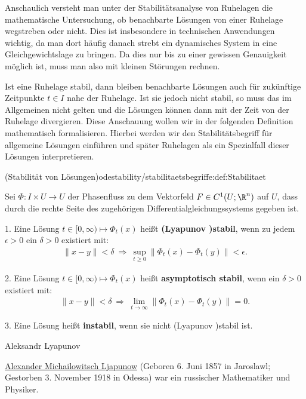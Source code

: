 \documentclass[letterpaper,10pt,english]{jupyterBook}
\begin{document}
\par
Anschaulich versteht man unter der Stabilitätsanalyse von Ruhelagen die mathematische Untersuchung, ob benachbarte Lösungen von einer Ruhelage wegstreben oder nicht.
Dies ist insbesondere in technischen Anwendungen wichtig, da man dort häufig danach strebt ein dynamisches System in eine Gleichgewichtslage zu bringen.
Da dies nur bis zu einer gewissen Genauigkeit möglich ist, muss man also mit kleinen Störungen rechnen.

\par
Ist eine Ruhelage stabil, dann bleiben benachbarte Lösungen auch für zukünftige Zeitpunkte \(t \in I\) nahe der Ruhelage.
Ist sie jedoch nicht stabil, so muss das im Allgemeinen nicht gelten und die Lösungen können dann mit der Zeit von der Ruhelage divergieren.
Diese Anschauung wollen wir in der folgenden Definition mathematisch formalisieren.
Hierbei werden wir den Stabilitätsbegriff für allgemeine Lösungen einführen und später Ruhelagen als ein Spezialfall dieser Lösungen interpretieren.
\begin{definition}{(Stabilität von Lösungen)}{odestability/stabilitaetsbegriffe:def:Stabilitaet}



\par
Sei \(\Phi \colon I \times U \rightarrow U\) der Phasenfluss zu dem Vektorfeld \(F\in C^1(U;\R^n)\) auf \(U\), dass durch die rechte Seite des zugehörigen Differentialgleichungssystems gegeben ist.

\par
1. Eine Lösung \(t \in [0,\infty) \mapsto \Phi_t(x)\) heißt \textbf{(Lyapunov )stabil}, wenn zu jedem \(\epsilon > 0\) ein \(\delta>0\) existiert mit:
\begin{align*}
\|x-y\|<\delta \ \Rightarrow \ \sup_{t\geq0}\|\Phi_t(x)-\Phi_t(y)\|<\epsilon.
\end{align*}
\par
2. Eine Lösung \( t \in [0,\infty) \mapsto \Phi_t(x)\) heißt \textbf{asymptotisch stabil}, wenn ein \(\delta > 0\) existiert mit:
\begin{align*}
\|x-y\|<\delta \ \Rightarrow \ \lim_{t\to\infty}\|\Phi_t(x)-\Phi_t(y)\|=0.
\end{align*}
\par
3. Eine Lösung heißt \textbf{instabil}, wenn sie nicht (Lyapunov )stabil ist.
\end{definition}

\begin{emphBox}{Aleksandr Lyapunov}{}

\par
\href{https://de.wikipedia.org/wiki/Alexander\_Michailowitsch\_Ljapunow}{Alexander Michailowitsch Ljapunow} (Geboren 6. Juni 1857 in Jaroslawl; Gestorben 3. November 1918 in Odessa) war ein russischer Mathematiker und Physiker.
\end{emphBox}
\end{document}
